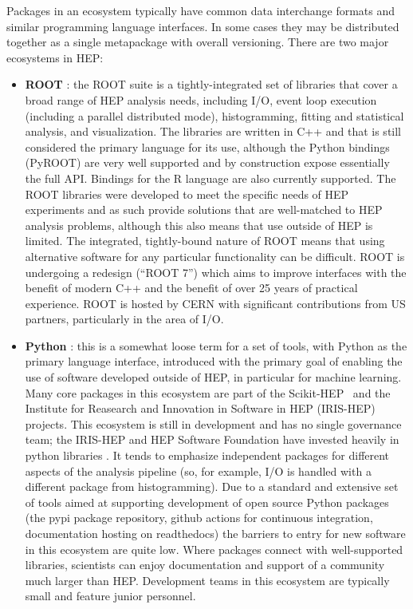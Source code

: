 Packages in an ecosystem typically have common data interchange formats and similar programming language interfaces. In some cases they may be distributed together as a single metapackage with overall versioning. There are two major ecosystems in HEP:
\begin{itemize}
    \item \textbf{ROOT} \cite{Brun:1997pa}: the ROOT suite is a tightly-integrated set of libraries that cover a broad range of HEP analysis needs, including I/O, event loop execution (including a parallel distributed mode), histogramming, fitting and statistical analysis, and visualization. The libraries are written in C++ and that is still considered the primary language for its use, although the Python bindings (PyROOT) are very well supported and by construction expose essentially the full API.  Bindings for the R language are also currently supported. The ROOT libraries were developed to meet the specific needs of HEP experiments and as such provide solutions that are well-matched to HEP analysis problems, although this also means that use outside of HEP is limited. The integrated, tightly-bound nature of ROOT means that using alternative software for any particular functionality can be difficult. ROOT is undergoing a redesign \cite{Naumann:2022pub} (``ROOT 7'') which aims to improve interfaces with the benefit of modern C++ and the benefit of over 25 years of practical experience. ROOT is hosted by CERN with significant contributions from US partners, particularly in the area of I/O.
    \item \textbf{Python} \cite{van1995python,10.5555/1593511}: this is a somewhat loose term for a set of tools, with Python as the primary language interface, introduced with the primary goal of enabling the use of software developed outside of HEP, in particular for machine learning. Many core packages in this ecosystem are part of the Scikit-HEP~\cite{Rodrigues:2020syo} and the Institute for Reasearch and Innovation in Software in HEP (IRIS-HEP)~\cite{IRISHEPWEB} projects. This ecosystem is still in development and has no single governance team; the IRIS-HEP and HEP Software Foundation have invested heavily in python libraries \cite{Pivarski:2022ycs}. It tends to emphasize independent packages for different aspects of the analysis pipeline (so, for example, I/O is handled with a different package from histogramming). Due to a standard and extensive set of tools aimed at supporting development of open source Python packages (the pypi package repository, github actions for continuous integration, documentation hosting on readthedocs) the barriers to entry for new software in this ecosystem are quite low. Where packages connect with well-supported libraries, scientists can enjoy documentation and support of a community much larger than HEP.  Development teams in this ecosystem are typically small and feature junior personnel.
\end{itemize}

